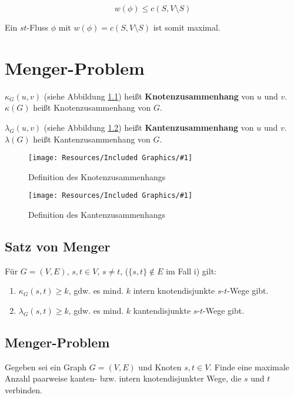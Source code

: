 \documentclass[a4paper,11pt]{report}
\newcommand{\fig}[2]{
    \begin{figure}[h]
        \begin{center}
            \texttt{[image: Resources/Included Graphics/\#1]}
            \caption{#1}
            \label{fig:#1}
        \end{center}
    \end{figure}
}
\begin{document}
\[ w(\phi) \leq c(S, V \setminus S) \]

Ein $st$-Fluss $\phi$ mit $w(\phi) = c(S, V \setminus S)$ ist somit maximal.


\chapter{Menger-Problem}
$\kappa_G(u, v)$ (siehe Abbildung \ref{fig:Definition des Knotenzusammenhangs}) heißt \textbf{Knotenzusammenhang} von $u$ und $v$.\\
$\kappa(G)$ heißt Knotenzusammenhang von $G$.

$\lambda_G(u, v)$ (siehe Abbildung \ref{fig:Definition des Kantenzusammenhangs}) heißt \textbf{Kantenzusammenhang} von $u$ und $v$.\\
$\lambda(G)$ heißt Kantenzusammenhang von $G$.

\fig{Definition des Knotenzusammenhangs}{.6}
\fig{Definition des Kantenzusammenhangs}{.5}


\section{Satz von Menger}
Für $G = (V, E)$, $s, t \in V$, $s \neq t$, ($\{s, t\} \not \in E$ im Fall i) gilt:

\begin{enumerate}
    \item $\kappa_G(s, t) \geq k$, gdw. es mind. $k$ intern knotendisjunkte $s$-$t$-Wege gibt.
    \item $\lambda_G(s, t) \geq k$, gdw. es mind. $k$ kantendisjunkte $s$-$t$-Wege gibt.
\end{enumerate}

\section{Menger-Problem}
Gegeben sei ein Graph $G = (V, E)$ und Knoten $s, t \in V$. Finde eine maximale Anzahl paarweise kanten- bzw. intern knotendisjunkter Wege, die $s$ und $t$ verbinden.
\end{document}
